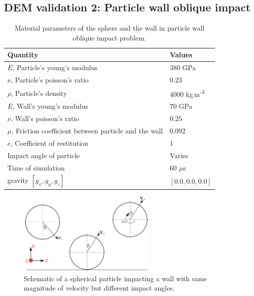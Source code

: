 \documentclass[preprint,12pt]{elsarticle}
\begin{document}
\FloatBarrier%
\subsection{DEM validation 2: Particle wall oblique impact}
\label{sec:DEM_validation_2_particle_wall_impact}

\begin{table}[!ht]
  \centering
  \begin{tabular}[!ht]{ll}
    \toprule
    Quantity & Values\\
    \midrule
    $E$, Particle's young's modulus & $380$ GPa \\
    $\nu$, Particle's poisson's ratio & $0.23$ \\
    $\rho$, Particle's density & $4000$ kg\,m\textsuperscript{-3} \\
    $E$, Wall's young's modulus & $70$ GPa \\
    $\nu$, Wall's poisson's ratio & $0.25$ \\
    $\mu$, Friction coefficient between particle and the wall & $0.092$ \\
    $e$, Coefficient of restitution & $1$ \\
    Impact angle of particle & Varies \\
    Time of simulation & 60 $\mu$s \\
    gravity $[g_x, g_y, g_z]$ & $[0.0, 0.0, 0.0]$\\
    \bottomrule
  \end{tabular}
  \caption{Material parameters of the sphere and the wall in particle wall
    oblique impact problem.}%
  \label{tab:dem_validation_2}
\end{table}
\begin{figure}[!htpb]
  \centering
  \includegraphics[width=0.6\textwidth]{images/results_dem_2_validation_particle_wall_impact/schematic}
  \caption{Schematic of a spherical particle impacting a wall
    with same magnitude of velocity but different impact angles.}
  \label{fig:result:dem_sw_contact_schematic}
\end{figure}
\end{document}
